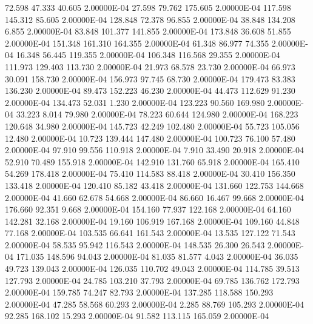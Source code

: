     72.598    47.333    40.605  2.00000E-04
    27.598    79.762   175.605  2.00000E-04
   117.598   145.312    85.605  2.00000E-04
   128.848    72.378    96.855  2.00000E-04
    38.848   134.208     6.855  2.00000E-04
    83.848   101.377   141.855  2.00000E-04
   173.848    36.608    51.855  2.00000E-04
   151.348   161.310   164.355  2.00000E-04
    61.348    86.977    74.355  2.00000E-04
    16.348    56.445   119.355  2.00000E-04
   106.348   116.568    29.355  2.00000E-04
   111.973   129.403   113.730  2.00000E-04
    21.973    68.578    23.730  2.00000E-04
    66.973    30.091   158.730  2.00000E-04
   156.973    97.745    68.730  2.00000E-04
   179.473    83.383   136.230  2.00000E-04
    89.473   152.223    46.230  2.00000E-04
    44.473   112.629    91.230  2.00000E-04
   134.473    52.031     1.230  2.00000E-04
   123.223    90.560   169.980  2.00000E-04
    33.223     8.014    79.980  2.00000E-04
    78.223    60.644   124.980  2.00000E-04
   168.223   120.648    34.980  2.00000E-04
   145.723    42.249   102.480  2.00000E-04
    55.723   105.056    12.480  2.00000E-04
    10.723   139.444   147.480  2.00000E-04
   100.723    76.100    57.480  2.00000E-04
    97.910    99.556   110.918  2.00000E-04
     7.910    33.490    20.918  2.00000E-04
    52.910    70.489   155.918  2.00000E-04
   142.910   131.760    65.918  2.00000E-04
   165.410    54.269   178.418  2.00000E-04
    75.410   114.583    88.418  2.00000E-04
    30.410   156.350   133.418  2.00000E-04
   120.410    85.182    43.418  2.00000E-04
   131.660   122.753   144.668  2.00000E-04
    41.660    62.678    54.668  2.00000E-04
    86.660    16.467    99.668  2.00000E-04
   176.660    92.351     9.668  2.00000E-04
   154.160    77.937   122.168  2.00000E-04
    64.160   142.281    32.168  2.00000E-04
    19.160   106.919   167.168  2.00000E-04
   109.160    44.848    77.168  2.00000E-04
   103.535    66.641   161.543  2.00000E-04
    13.535   127.122    71.543  2.00000E-04
    58.535    95.942   116.543  2.00000E-04
   148.535    26.300    26.543  2.00000E-04
   171.035   148.596    94.043  2.00000E-04
    81.035    81.577     4.043  2.00000E-04
    36.035    49.723   139.043  2.00000E-04
   126.035   110.702    49.043  2.00000E-04
   114.785    39.513   127.793  2.00000E-04
    24.785   103.210    37.793  2.00000E-04
    69.785   136.762   172.793  2.00000E-04
   159.785    74.247    82.793  2.00000E-04
   137.285   118.588   150.293  2.00000E-04
    47.285    58.568    60.293  2.00000E-04
     2.285    88.769   105.293  2.00000E-04
    92.285   168.102    15.293  2.00000E-04
    91.582   113.115   165.059  2.00000E-04
